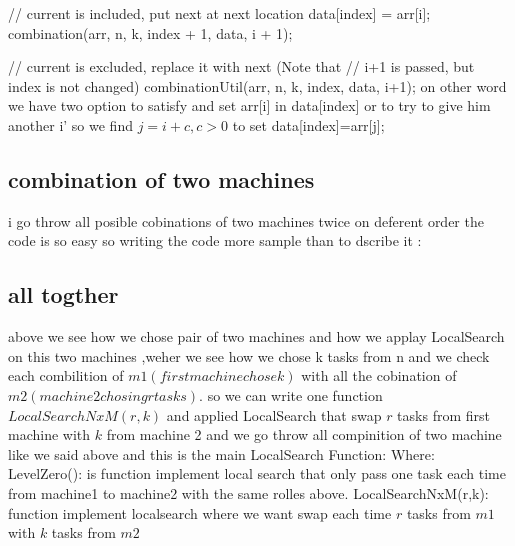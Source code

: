 \documentclass[a4paper,12pt]{report}
\begin{document}
 // current is included, put next at next location  \newline
    data[index] = arr[i];  \newline
    combination(arr, n, k, index + 1, data, i + 1);  \newline
  
    // current is excluded, replace it with next (Note that  \newline
    // i+1 is passed, but index is not changed)  \newline
    combinationUtil(arr, n, k, index, data, i+1);   \newline
on other word we have two option to satisfy and set arr[i] in data[index] or to try to give him another i' so we find $j=i+c,c>0$ to set data[index]=arr[j]; \newline
 \subsection{combination of two machines} 
i go throw all posible cobinations of two machines twice on deferent order the code is so easy so writing the code more sample than to dscribe it :\newline 

\subsection{all togther} 
above we see how we chose pair of two machines and how we applay LocalSearch on this two machines ,weher we see how we chose k tasks from n and we check each combilition of $m1(first machine chose k)$ with all the cobination of $m2(machine2 chosing r tasks)$.\newline
so we can write one function $LocalSearchNxM(r,k)$ and applied LocalSearch that swap $r$ tasks from first machine with $k$ from machine 2 and we go throw all compinition of two machine like we said above \newline
and this is the main LocalSearch Function:\newline
Where: \newline
LevelZero(): is function implement local search that only pass one task each time from machine1 to machine2 with the same rolles above.\newline
 LocalSearchNxM(r,k): function implement localsearch where we want swap each time $r$ tasks from $m1$ with $k$ tasks from $m2$ 
 
\end{document}
